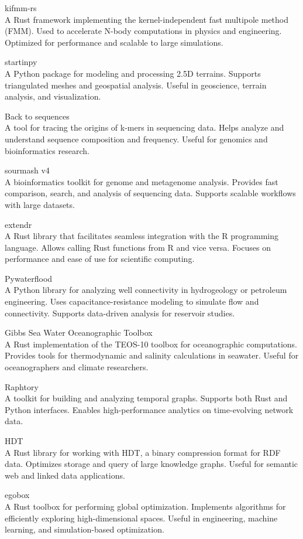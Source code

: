 \documentclass{article}
\begin{document}
kifmm-rs\\
A Rust framework implementing the kernel-independent fast multipole method (FMM). Used
to accelerate N-body computations in physics and engineering. Optimized for performance and
scalable to large simulations.

startinpy\\
A Python package for modeling and processing 2.5D terrains. Supports triangulated
meshes and geospatial analysis. Useful in geoscience, terrain analysis, and visualization.

Back to sequences\\
A tool for tracing the origins of k-mers in sequencing data. Helps analyze and
understand sequence composition and frequency. Useful for genomics and bioinformatics research.

sourmash v4\\
A bioinformatics toolkit for genome and metagenome analysis. Provides fast
comparison, search, and analysis of sequencing data. Supports scalable workflows with large
datasets.

extendr\\
A Rust library that facilitates seamless integration with the R programming language.
Allows calling Rust functions from R and vice versa. Focuses on performance and ease of use for
scientific computing.

Pywaterflood\\
A Python library for analyzing well connectivity in hydrogeology or petroleum
engineering. Uses capacitance-resistance modeling to simulate flow and connectivity. Supports
data-driven analysis for reservoir studies.

Gibbs Sea Water Oceanographic Toolbox\\
A Rust implementation of the TEOS-10 toolbox for
oceanographic computations. Provides tools for thermodynamic and salinity calculations in seawater.
Useful for oceanographers and climate researchers.

Raphtory\\
A toolkit for building and analyzing temporal graphs. Supports both Rust and Python
interfaces. Enables high-performance analytics on time-evolving network data.

HDT\\
A Rust library for working with HDT, a binary compression format for RDF data. Optimizes
storage and query of large knowledge graphs. Useful for semantic web and linked data applications.

egobox\\
A Rust toolbox for performing global optimization. Implements algorithms for efficiently
exploring high-dimensional spaces. Useful in engineering, machine learning, and simulation-based
optimization.
\end{document}
